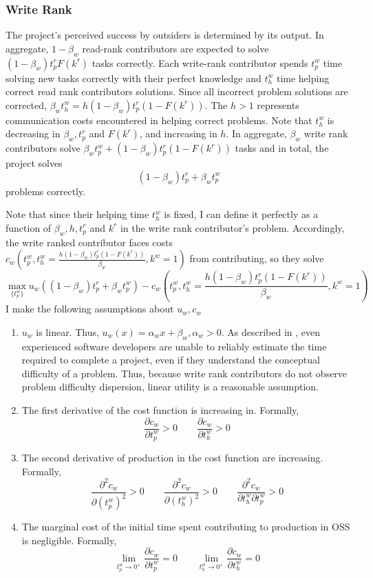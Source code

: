\documentclass[source/paper/main.tex]{subfiles}
\begin{document}
\subsubsection{Write Rank}
The project's perceived success by outsiders is determined by its output. In aggregate, $1-\beta_w$ read-rank contributors are expected to solve $(1-\beta_w) t_p^rF(k^r)$ tasks correctly. Each write-rank contributor spends $t_p^w$ time solving new tasks correctly with their perfect knowledge and $t_h^w$ time helping correct read rank contributors solutions. Since all incorrect problem solutions are corrected, $\beta_w t_h^w = h (1-\beta_w) t_p^r(1-F(k^r))$. The $h>1$ represents communication costs encountered in helping correct problems. Note that $t_h^w$ is decreasing in $\beta_w, t_p^r$ and $F(k^r)$, and increasing in $h$. In aggregate, $\beta_w$ write rank contributors solve $\beta_w t_p^w + (1-\beta_w) t_p^r(1-F(k^r))$ tasks and in total, the project solves
$$ (1-\beta_w) t_p^r + \beta_w t_p^w $$
problems correctly.

\qquad Note that since their helping time $t_h^w$ is fixed, I can define it perfectly as a function of $\beta_w, h, t_p^r$ and $k^r$ in the write rank contributor's problem. Accordingly, the write ranked contributor faces costs $c_w\left(t_p^w, t_h^w = \frac{h (1-\beta_w) t_p^r(1-F(k^r))}{\beta_w}, k^w = 1\right)$ from contributing, so they solve
$$\max_{\{t_p^w\}} u_w\left((1-\beta_w) t_p^r + \beta_w t_p^w \right) - c_w\left(t_p^w, t_h^w = \frac{ h (1-\beta_w) t_p^r(1-F(k^r))}{\beta_w}, k^w = 1\right)$$
I make the following assumptions about $u_w, c_w$
\begin{enumerate}
    \item $u_w$ is linear. Thus, $u_w(x) = \alpha_wx + \beta_w, \alpha_w > 0$. As described in \cite{jr_mythical_1995}, even experienced software developers are unable to reliably estimate the time required to complete a project, even if they understand the conceptual difficulty of a problem. Thus, because write rank contributors do not observe problem difficulty dispersion, linear utility is a reasonable assumption. 
    \item The first derivative of the cost function is increasing in. Formally, 
    $$\frac{\partial c_w}{\partial t_p^w}>0 \qquad \frac{\partial c_w}{\partial t_h^w}>0 $$   
    \item  The second derivative of production in the cost function are increasing. Formally, $$ \frac{\partial^2 c_w}{\partial (t_p^w)^2}>0 \qquad  \frac{\partial^2 c_w}{\partial (t_h^w)^2}>0 \qquad  \frac{\partial^2 c_w}{\partial t_h^w \partial t_p^w}>0$$
    \item The marginal cost of the initial time spent contributing to production in OSS is negligible. Formally,
    $$\lim_{t_p^w \to 0^+} \frac{\partial c_w}{\partial t_p^w} = 0 \qquad \lim_{t_h^w \to 0^+} \frac{\partial c_w}{\partial t_h^w} = 0$$
\end{enumerate}
\end{document}
